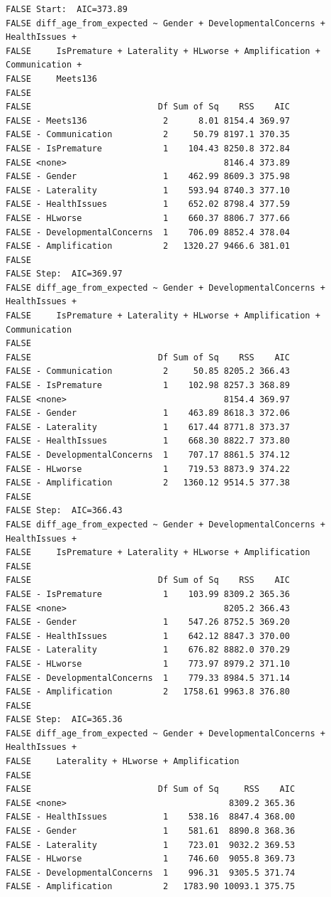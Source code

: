 \documentclass[english,man]{apa6}
\begin{document}
\begin{verbatim}
FALSE Start:  AIC=373.89
FALSE diff_age_from_expected ~ Gender + DevelopmentalConcerns + HealthIssues + 
FALSE     IsPremature + Laterality + HLworse + Amplification + Communication + 
FALSE     Meets136
FALSE 
FALSE                         Df Sum of Sq    RSS    AIC
FALSE - Meets136               2      8.01 8154.4 369.97
FALSE - Communication          2     50.79 8197.1 370.35
FALSE - IsPremature            1    104.43 8250.8 372.84
FALSE <none>                               8146.4 373.89
FALSE - Gender                 1    462.99 8609.3 375.98
FALSE - Laterality             1    593.94 8740.3 377.10
FALSE - HealthIssues           1    652.02 8798.4 377.59
FALSE - HLworse                1    660.37 8806.7 377.66
FALSE - DevelopmentalConcerns  1    706.09 8852.4 378.04
FALSE - Amplification          2   1320.27 9466.6 381.01
FALSE 
FALSE Step:  AIC=369.97
FALSE diff_age_from_expected ~ Gender + DevelopmentalConcerns + HealthIssues + 
FALSE     IsPremature + Laterality + HLworse + Amplification + Communication
FALSE 
FALSE                         Df Sum of Sq    RSS    AIC
FALSE - Communication          2     50.85 8205.2 366.43
FALSE - IsPremature            1    102.98 8257.3 368.89
FALSE <none>                               8154.4 369.97
FALSE - Gender                 1    463.89 8618.3 372.06
FALSE - Laterality             1    617.44 8771.8 373.37
FALSE - HealthIssues           1    668.30 8822.7 373.80
FALSE - DevelopmentalConcerns  1    707.17 8861.5 374.12
FALSE - HLworse                1    719.53 8873.9 374.22
FALSE - Amplification          2   1360.12 9514.5 377.38
FALSE 
FALSE Step:  AIC=366.43
FALSE diff_age_from_expected ~ Gender + DevelopmentalConcerns + HealthIssues + 
FALSE     IsPremature + Laterality + HLworse + Amplification
FALSE 
FALSE                         Df Sum of Sq    RSS    AIC
FALSE - IsPremature            1    103.99 8309.2 365.36
FALSE <none>                               8205.2 366.43
FALSE - Gender                 1    547.26 8752.5 369.20
FALSE - HealthIssues           1    642.12 8847.3 370.00
FALSE - Laterality             1    676.82 8882.0 370.29
FALSE - HLworse                1    773.97 8979.2 371.10
FALSE - DevelopmentalConcerns  1    779.33 8984.5 371.14
FALSE - Amplification          2   1758.61 9963.8 376.80
FALSE 
FALSE Step:  AIC=365.36
FALSE diff_age_from_expected ~ Gender + DevelopmentalConcerns + HealthIssues + 
FALSE     Laterality + HLworse + Amplification
FALSE 
FALSE                         Df Sum of Sq     RSS    AIC
FALSE <none>                                8309.2 365.36
FALSE - HealthIssues           1    538.16  8847.4 368.00
FALSE - Gender                 1    581.61  8890.8 368.36
FALSE - Laterality             1    723.01  9032.2 369.53
FALSE - HLworse                1    746.60  9055.8 369.73
FALSE - DevelopmentalConcerns  1    996.31  9305.5 371.74
FALSE - Amplification          2   1783.90 10093.1 375.75
\end{verbatim}
\end{document}
